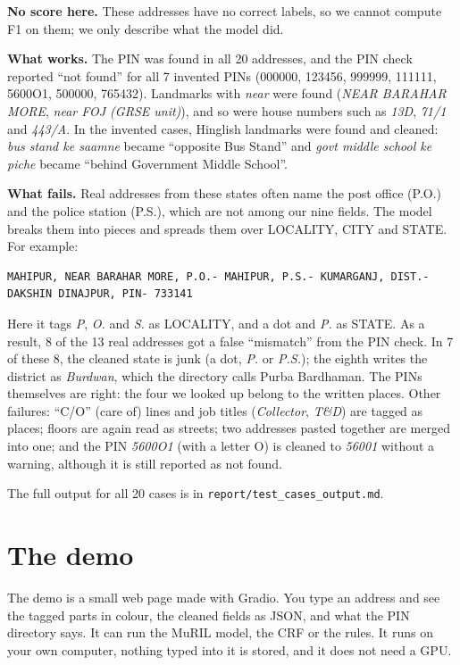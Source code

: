 \documentclass[11pt,a4paper]{article}
\newcommand{\code}[1]{\texttt{#1}}
\begin{document}
\begin{notebox}
\textbf{\textsf{No score here.}} These addresses have no correct labels, so we cannot compute F1 on them; we only
describe what the model did.
\end{notebox}

\textbf{What works.} The PIN was found in all 20 addresses, and the PIN check reported ``not found'' for all 7
invented PINs (000000, 123456, 999999, 111111, 5600O1, 500000, 765432). Landmarks with \emph{near} were found
(\emph{NEAR BARAHAR MORE}, \emph{near FOJ (GRSE unit)}), and so were house numbers such as \emph{13D}, \emph{71/1} and
\emph{443/A}. In the invented cases, Hinglish landmarks were found and cleaned: \emph{bus stand ke saamne} became
``opposite Bus Stand'' and \emph{govt middle school ke piche} became ``behind Government Middle School''.

\textbf{What fails.} Real addresses from these states often name the post office (P.O.) and the police station
(P.S.), which are not among our nine fields. The model breaks them into pieces and spreads them over LOCALITY, CITY
and STATE. For example:
\begin{lstlisting}
MAHIPUR, NEAR BARAHAR MORE, P.O.- MAHIPUR, P.S.- KUMARGANJ, DIST.- DAKSHIN DINAJPUR, PIN- 733141
\end{lstlisting}
Here it tags \emph{P}, \emph{O.} and \emph{S.} as LOCALITY, and a dot and \emph{P.} as STATE. As a result, 8 of the 13
real addresses got a false ``mismatch'' from the PIN check. In 7 of these 8, the cleaned state is junk (a dot,
\emph{P.} or \emph{P.S.}); the eighth writes the district as \emph{Burdwan}, which the directory calls Purba Bardhaman.
The PINs themselves are right: the four we looked up belong to the written places. Other failures: ``C/O'' (care of)
lines and job titles (\emph{Collector}, \emph{T\&D}) are tagged as places; floors are again read as streets; two
addresses pasted together are merged into one; and the PIN \emph{5600O1} (with a letter O) is cleaned to \emph{56001}
without a warning, although it is still reported as not found.

The full output for all 20 cases is in \code{report/test\_cases\_output.md}.

\section{The demo}
The demo is a small web page made with Gradio. You type an address and see the tagged parts in colour, the cleaned
fields as JSON, and what the PIN directory says. It can run the MuRIL model, the CRF or the rules. It runs on your own
computer, nothing typed into it is stored, and it does not need a GPU.
\end{document}
